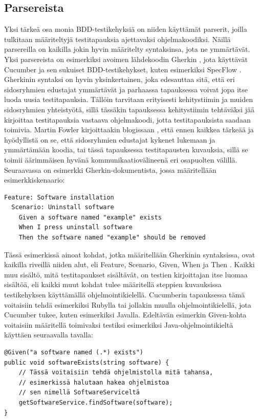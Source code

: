 \documentclass[finnish,nonumbib,nocopyright]{gradu2}
\begin{document}
\subsection{Parsereista}
Yksi tärkeä osa monia BDD-testikehyksiä on niiden käyttämät parserit, joilla tulkitaan määriteltyjä testitapauksia ajettavaksi ohjelmakoodiksi. Näillä parsereilla on kaikilla jokin hyvin määritelty syntaksinsa, jota ne ymmärtävät. Yksi parsereista on esimerkiksi avoimen lähdekoodin Gherkin \cite{gherkin}, jota käyttävät Cucumber \cite{cucumber} ja sen sukuiset BDD-testikehykset, kuten esimerkiksi SpecFlow \cite{specflow}. Gherkinin syntaksi on hyvin yksinkertainen, joka edesauttaa sitä, että eri sidosryhmien edustajat ymmärtävät ja parhaassa tapauksessa voivat jopa itse luoda uusia testitapauksia. Tällöin tarvitaan erityisesti kehitystiimin ja muiden sidosryhmien yhteistyötä, sillä tässäkin tapauksessa kehitystiimin tehtäväksi jää kirjoittaa testitapauksia vastaava ohjelmakoodi, jotta testitapauksista saadaan toimivia. Martin Fowler kirjoittaakin blogissaan \cite{businessdsl}, että ennen kaikkea tärkeää ja hyödyllistä on se, että sidosryhmien edustajat kykenet lukemaan ja ymmärtämään koodia, tai tässä tapauksessa testitapausten kuvauksia, sillä se toimii äärimmäisen hyvänä kommunikaatiovälineenä eri osapuolten välillä. Seuraavassa on esimerkki Gherkin-dokumentista, jossa määritellään esimerkkiskenaario:
\begin{verbatim}
Feature: Software installation
  Scenario: Uninstall software
    Given a software named "example" exists
    When I press uninstall software
    Then the software named "example" should be removed
\end{verbatim}
Tässä esimerkissä ainoat kohdat, jotka määritellään Gherkinin syntaksissa, ovat kaikilla riveillä niiden alut, eli Feature, Scenario, Given, When ja Then \cite{gherkin2}. Kaikki muu sisältö, mitä testitapaukset sisältävät, on testien kirjoittajan itse luomaa sisältöä, eli kaikki muut kohdat tulee määritellä steppien kuvauksissa testikehyksen käyttämällä ohjelmointikielellä. Cucumberin tapauksessa tämä voitaisiin tehdä esimerkiksi Rubylla tai jollakin muulla ohjelmointikielellä, jota Cucumber tukee, kuten esimerkiksi Javalla. Edeltävän esimerkin Given-kohta voitaisiin määritellä toimivaksi testiksi esimerkiksi Java-ohjelmointikieltä käyttäen seuraavalla tavalla:
\begin{verbatim}
@Given("a software named (.*) exists")
public void softwareExists(string software) {
    // Tässä voitaisiin tehdä ohjelmistolla mitä tahansa,
    // esimerkissä halutaan hakea ohjelmistoa
    // sen nimellä SoftwareServiceltä
    getSoftwareService.findSoftware(software);
}
\end{verbatim} 
\end{document}

